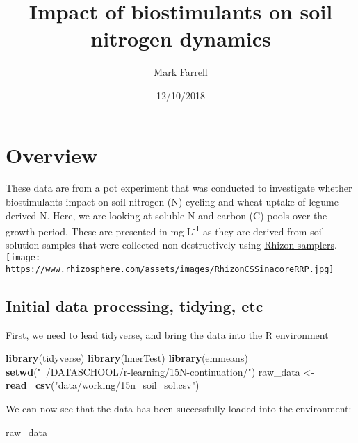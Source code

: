 \documentclass[]{article}
\title{Impact of biostimulants on soil nitrogen dynamics}
\author{Mark Farrell}
\date{12/10/2018}
\newenvironment{Shaded}{\begin{snugshade}}{\end{snugshade}}
\newcommand{\KeywordTok}[1]{\textcolor[rgb]{0.13,0.29,0.53}{\textbf{#1}}}
\newcommand{\StringTok}[1]{\textcolor[rgb]{0.31,0.60,0.02}{#1}}
\newcommand{\NormalTok}[1]{#1}
\begin{document}
\maketitle

\section{Overview}\label{overview}

These data are from a pot experiment that was conducted to investigate
whether biostimulants impact on soil nitrogen (N) cycling and wheat
uptake of legume-derived N. Here, we are looking at soluble N and carbon
(C) pools over the growth period. These are presented in mg
L\textsuperscript{-1} as they are derived from soil solution samples
that were collected non-destructively using
\href{https://www.rhizosphere.com/}{Rhizon samplers}.
\texttt{[image: https://www.rhizosphere.com/assets/images/RhizonCSSinacoreRRP.jpg]}

\subsection{Initial data processing, tidying,
etc}\label{initial-data-processing-tidying-etc}

First, we need to lead tidyverse, and bring the data into the R
environment

\begin{Shaded}
\begin{Highlighting}[]
\KeywordTok{library}\NormalTok{(tidyverse)}
\KeywordTok{library}\NormalTok{(lmerTest)}
\KeywordTok{library}\NormalTok{(emmeans)}
\KeywordTok{setwd}\NormalTok{(}\StringTok{"~/DATASCHOOL/r-learning/15N-continuation/"}\NormalTok{)}
\NormalTok{raw_data <-}\StringTok{ }\KeywordTok{read_csv}\NormalTok{(}\StringTok{"data/working/15n_soil_sol.csv"}\NormalTok{)}
\end{Highlighting}
\end{Shaded}

We can now see that the data has been successfully loaded into the
environment:

\begin{Shaded}
\begin{Highlighting}[]
\NormalTok{raw_data}
\end{Highlighting}
\end{Shaded}
\end{document}
